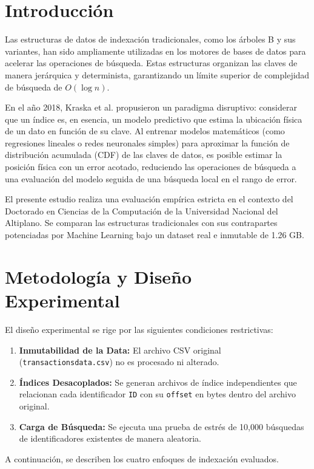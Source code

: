 \documentclass[twocolumn,10pt,journal]{IEEEtran}
\begin{document}
\section{Introducci\'on}
Las estructuras de datos de indexación tradicionales, como los árboles B y sus variantes, han sido ampliamente utilizadas en los motores de bases de datos para acelerar las operaciones de búsqueda. Estas estructuras organizan las claves de manera jerárquica y determinista, garantizando un límite superior de complejidad de búsqueda de $O(\log n)$.

En el año 2018, Kraska et al. \cite{kraska2018case} propusieron un paradigma disruptivo: considerar que un índice es, en esencia, un modelo predictivo que estima la ubicación física de un dato en función de su clave. Al entrenar modelos matemáticos (como regresiones lineales o redes neuronales simples) para aproximar la función de distribución acumulada (CDF) de las claves de datos, es posible estimar la posición física con un error acotado, reduciendo las operaciones de búsqueda a una evaluación del modelo seguida de una búsqueda local en el rango de error.

El presente estudio realiza una evaluación empírica estricta en el contexto del Doctorado en Ciencias de la Computación de la Universidad Nacional del Altiplano. Se comparan las estructuras tradicionales con sus contrapartes potenciadas por Machine Learning bajo un dataset real e inmutable de 1.26 GB.

\section{Metodolog\'ia y Dise\~no Experimental}
El diseño experimental se rige por las siguientes condiciones restrictivas:
\begin{enumerate}
    \item \textbf{Inmutabilidad de la Data:} El archivo CSV original (\texttt{transactions\textunderscore data.csv}) no es procesado ni alterado.
    \item \textbf{Índices Desacoplados:} Se generan archivos de índice independientes que relacionan cada identificador \texttt{ID} con su \texttt{offset} en bytes dentro del archivo original.
    \item \textbf{Carga de Búsqueda:} Se ejecuta una prueba de estrés de 10,000 búsquedas de identificadores existentes de manera aleatoria.
\end{enumerate}

A continuación, se describen los cuatro enfoques de indexación evaluados.
\end{document}
